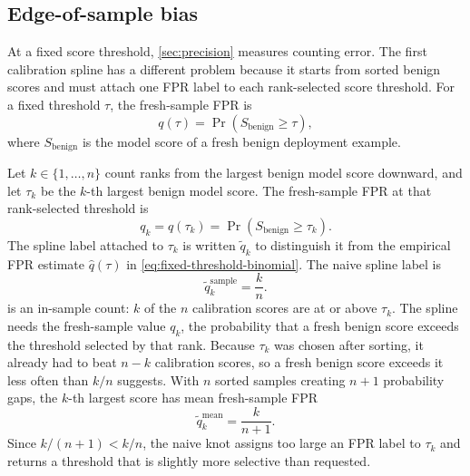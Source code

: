 \documentclass{article}
\begin{document}
\subsection{Edge-of-sample bias}
\label{sec:bias}

At a fixed score threshold, \cref{sec:precision} measures counting error.
The first calibration spline has a different problem because it starts from sorted benign scores and must attach one FPR label to each rank-selected score threshold.
For a fixed threshold $\tau$, the fresh-sample FPR is
\begin{equation}
\label{eq:true-deployment-fpr}
q(\tau)=\Pr(S_{\mathrm{benign}}\ge\tau),
\end{equation}
where $S_{\mathrm{benign}}$ is the model score of a fresh benign deployment example.

Let $k\in\{1,\ldots,n\}$ count ranks from the largest benign model score downward, and let $\tau_k$ be the $k$-th largest benign model score.
The fresh-sample FPR at that rank-selected threshold is
\begin{equation}
\label{eq:rank-selected-fpr}
q_k=q(\tau_k)=\Pr(S_{\mathrm{benign}}\ge\tau_k).
\end{equation}
The spline label attached to $\tau_k$ is written $\widetilde q_k$ to distinguish it from the empirical FPR estimate $\widehat q(\tau)$ in \cref{eq:fixed-threshold-binomial}.
The naive spline label is
\begin{equation}
\label{eq:uncorrected-rank-position}
\widetilde q_k^{\mathrm{sample}}=\frac{k}{n}.
\end{equation}
 is an in-sample count: $k$ of the $n$ calibration scores are at or above $\tau_k$.
The spline needs the fresh-sample value $q_k$, the probability that a fresh benign score exceeds the threshold selected by that rank.
Because $\tau_k$ was chosen after sorting, it already had to beat $n-k$ calibration scores, so a fresh benign score exceeds it less often than $k/n$ suggests.
With $n$ sorted samples creating $n+1$ probability gaps, the $k$-th largest score has mean fresh-sample FPR \citep{nistOrderStatisticMeans}
\begin{equation}
\label{eq:mean-rank-position}
\widetilde q_k^{\mathrm{mean}}=\frac{k}{n+1}.
\end{equation}
Since $k/(n+1)<k/n$, the naive knot assigns too large an FPR label to $\tau_k$ and returns a threshold that is slightly more selective than requested.
\end{document}
